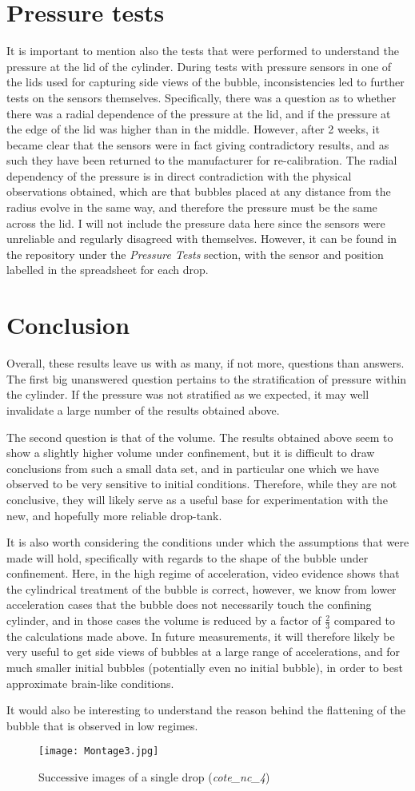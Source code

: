 \documentclass{article}
\begin{document}
\section{Pressure tests}
It is important to mention also the tests that were performed to understand the pressure at the lid of the cylinder. During tests with pressure sensors in one of the lids used for capturing side views of the bubble, inconsistencies led to further tests on the sensors themselves. Specifically, there was a question as to whether there was a radial dependence of the pressure at the lid, and if the pressure at the edge of the lid was higher than in the middle. However, after 2 weeks, it became clear that the sensors were in fact giving contradictory results, and as such they have been returned to the manufacturer for re-calibration. The radial dependency of the pressure is in direct contradiction with the physical observations obtained, which are that bubbles placed at any distance from the radius evolve in the same way, and therefore the pressure must be the same across the lid. I will not include the pressure data here since the sensors were unreliable and regularly disagreed with themselves. However, it can be found in the repository under the \emph{Pressure Tests} section, with the sensor and position labelled in the spreadsheet for each drop.

\section{Conclusion}

Overall, these results leave us with as many, if not more, questions than answers. The first big unanswered question pertains to the stratification of pressure within the cylinder. If the pressure was not stratified as we expected, it may well invalidate a large number of the results obtained above.

The second question is that of the volume. The results obtained above seem to show a slightly higher volume under confinement, but it is difficult to draw conclusions from such a small data set, and in particular one which we have observed to be very sensitive to initial conditions. Therefore, while they are not conclusive, they will likely serve as a useful base for experimentation with the new, and hopefully more reliable drop-tank.

It is also worth considering the conditions under which the assumptions that were made will hold, specifically with regards to the shape of the bubble under confinement. Here, in the high regime of acceleration, video evidence shows that the cylindrical treatment of the bubble is correct, however, we know from lower acceleration cases that the bubble does not necessarily touch the confining cylinder, and in those cases the volume is reduced by a factor of $\frac{2}{3}$ compared to the calculations made above. In future measurements, it will therefore likely be very useful to get side views of bubbles at a large range of accelerations, and for much smaller initial bubbles (potentially even no initial bubble), in order to best approximate brain-like conditions.

It would also be interesting to understand the reason behind the flattening of the bubble that is observed in low regimes.

\begin{figure}[H]
    \centering
    \texttt{[image: Montage3.jpg]}
    \caption{Successive images of a single drop (\emph{cote\_nc\_4})}
\end{figure}
\end{document}
